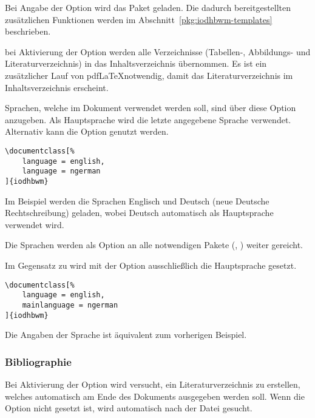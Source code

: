 \documentclass[babel=ngerman,highlight=false]{skdoc}
\begin{document}
                Bei Angabe der Option wird das Paket  geladen. Die dadurch bereitgestellten zusätzlichen Funktionen werden im Abschnitt~\ref{pkg:iodhbwm-templates} beschrieben.\medskip
                
                bei Aktivierung der Option werden alle Verzeichnisse (Tabellen-, Abbildungs- und Literaturverzeichnis) in das Inhaltsverzeichnis übernommen. Es ist ein zusätzlicher Lauf von pdf\LaTeX notwendig, damit das Literaturverzeichnis im Inhaltsverzeichnis erscheint.
                \medskip
                
                Sprachen, welche im Dokument verwendet werden soll, sind über diese Option anzugeben. Als Hauptsprache wird die letzte angegebene Sprache verwendet. Alternativ kann die Option  genutzt werden.
                
                \begin{verbatim}
\documentclass[%
    language = english,
    language = ngerman
]{iodhbwm}
                \end{verbatim}
                Im Beispiel werden die Sprachen Englisch und Deutsch (neue Deutsche Rechtschreibung) geladen, wobei Deutsch automatisch als Hauptsprache verwendet wird.
                
                Die Sprachen werden als Option an alle notwendigen Pakete (, ) weiter gereicht.\medskip
                
                \AndDefault{}\medskip
                Im Gegensatz zu  wird mit der Option ausschließlich die Hauptsprache gesetzt.
                
                \begin{verbatim}
\documentclass[%
    language = english,
    mainlanguage = ngerman
]{iodhbwm}
                \end{verbatim}
                Die Angaben der Sprache ist äquivalent zum vorherigen Beispiel.\medskip
            
            \subsubsection{Bibliographie}
                Bei Aktivierung der Option wird versucht, ein Literaturverzeichnis zu erstellen, welches automatisch am Ende des Dokuments ausgegeben werden soll. Wenn die Option  nicht gesetzt ist, wird automatisch nach der Datei  gesucht.
                
\end{document}
